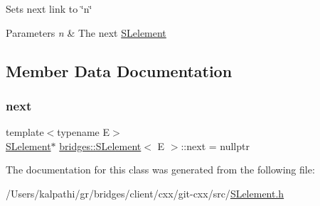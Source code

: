 Sets next link to \char`\"{}n\char`\"{}


\begin{DoxyParams}{Parameters}
{\em n} & The next \hyperlink{classbridges_1_1_s_lelement}{S\+Lelement} \\
\hline
\end{DoxyParams}


\subsection{Member Data Documentation}
\hypertarget{classbridges_1_1_s_lelement_ad7449d10a09ebc52653a7baed812aa43}{}\label{classbridges_1_1_s_lelement_ad7449d10a09ebc52653a7baed812aa43} 
\subsubsection{\texorpdfstring{next}{next}}
{\footnotesize\ttfamily template$<$typename E$>$ \\
\hyperlink{classbridges_1_1_s_lelement}{S\+Lelement}$\ast$ \hyperlink{classbridges_1_1_s_lelement}{bridges\+::\+S\+Lelement}$<$ E $>$\+::next = nullptr\hspace{0.3cm}{\ttfamily [protected]}}



The documentation for this class was generated from the following file\+:\begin{DoxyCompactItemize}
\item 
/\+Users/kalpathi/gr/bridges/client/cxx/git-\/cxx/src/\hyperlink{_s_lelement_8h}{S\+Lelement.\+h}\end{DoxyCompactItemize}
